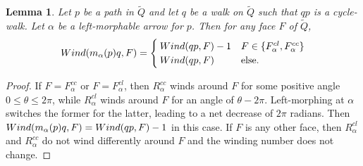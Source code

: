 \documentclass{article}
\newtheorem{lemma}[thm]{Lemma}
\theoremstyle{definition}
\newcommand{\wind}{\textup{Wind}}
\begin{document}
\begin{lemma}\label{lem:rotation-number-formula}
    Let $p$ be a path in $\widetilde Q$ and let $q$ be a walk on $\widetilde Q$ such that $qp$ is a cycle-walk. Let $\alpha$ be a left-morphable arrow for $p$. Then for any face $F$ of $\widetilde Q$,
    \begin{equation}
        \wind(m_\alpha(p)q,F)=
            \begin{cases}
		\wind(qp,F)-1 & F\in\{F_\alpha^{cl},F_\alpha^{cc}\}\\
                \wind(qp,F) & \text{else}.
            \end{cases}
    \end{equation}
\end{lemma}
\begin{proof}
    If $F=F_\alpha^{cc}$ or $F=F_\alpha^{cl}$, then $R_\alpha^{cc}$ winds around $F$ for some positive angle $0\leq\theta\leq2\pi$, while $R_\alpha^{cl}$ winds around $F$ for an angle of $\theta-2\pi$. Left-morphing at $\alpha$ switches the former for the latter, leading to a net decrease of $2\pi$ radians. Then $\wind(m_\alpha(p)q,F)=\wind(qp,F)-1$ in this case.
    If $F$ is any other face, then $R_\alpha^{cl}$ and $R_\alpha^{cc}$ do not wind differently around $F$ and the winding number does not change.
\end{proof}





































    
\end{document}
